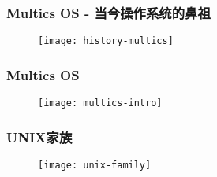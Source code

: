 \begin{frame}
    \frametitle{Multics OS - 当今操作系统的鼻祖}
    
    \begin{figure}
        \centering
        \texttt{[image: history-multics]}
    \end{figure}
    
\end{frame}


\begin{frame}
    \frametitle{Multics OS}
    
    \begin{figure}
        \centering
        \texttt{[image: multics-intro]}
    \end{figure}
    
\end{frame}

\begin{frame}[plain]
    
    \frametitle{UNIX家族}
    
    \begin{figure}
        \centering
        \texttt{[image: unix-family]}
    \end{figure}
    
\end{frame}

